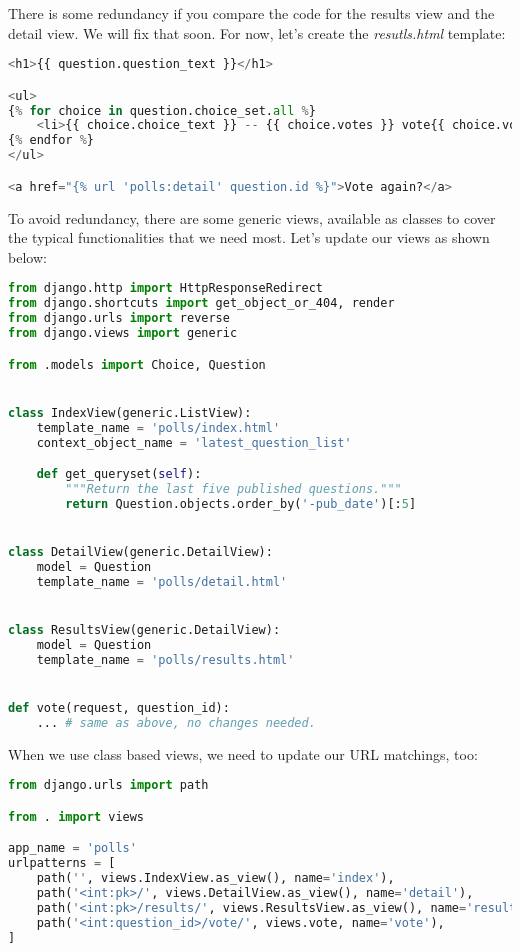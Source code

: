 \documentclass{homework}
\begin{document}
\newpage
There is some redundancy if you compare the code for the results view and the detail view. We will fix that soon. For now, let's create the \textit{resutls.html} template:
\begin{lstlisting}[language=Python]
<h1>{{ question.question_text }}</h1>

<ul>
{% for choice in question.choice_set.all %}
    <li>{{ choice.choice_text }} -- {{ choice.votes }} vote{{ choice.votes|pluralize }}</li>
{% endfor %}
</ul>

<a href="{% url 'polls:detail' question.id %}">Vote again?</a>
\end{lstlisting}
To avoid redundancy, there are some generic views, available as classes to cover the typical functionalities that we need most. Let's update our views as shown below:
\begin{lstlisting}[language=Python]
from django.http import HttpResponseRedirect
from django.shortcuts import get_object_or_404, render
from django.urls import reverse
from django.views import generic

from .models import Choice, Question


class IndexView(generic.ListView):
    template_name = 'polls/index.html'
    context_object_name = 'latest_question_list'

    def get_queryset(self):
        """Return the last five published questions."""
        return Question.objects.order_by('-pub_date')[:5]


class DetailView(generic.DetailView):
    model = Question
    template_name = 'polls/detail.html'


class ResultsView(generic.DetailView):
    model = Question
    template_name = 'polls/results.html'


def vote(request, question_id):
    ... # same as above, no changes needed.
\end{lstlisting}

\newpage
When we use class based views, we need to update our URL matchings, too:
\begin{lstlisting}[language=Python]
from django.urls import path

from . import views

app_name = 'polls'
urlpatterns = [
    path('', views.IndexView.as_view(), name='index'),
    path('<int:pk>/', views.DetailView.as_view(), name='detail'),
    path('<int:pk>/results/', views.ResultsView.as_view(), name='results'),
    path('<int:question_id>/vote/', views.vote, name='vote'),
]
\end{lstlisting}
\end{document}

